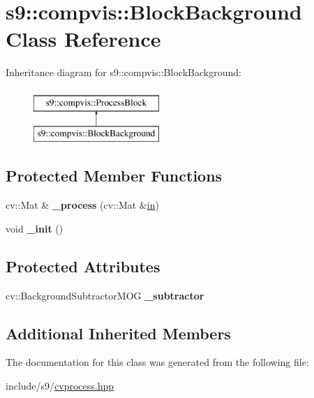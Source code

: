 \hypertarget{classs9_1_1compvis_1_1BlockBackground}{\section{s9\-:\-:compvis\-:\-:Block\-Background Class Reference}
\label{classs9_1_1compvis_1_1BlockBackground}
}
Inheritance diagram for s9\-:\-:compvis\-:\-:Block\-Background\-:\begin{figure}[H]
\begin{center}
\leavevmode
\includegraphics[height=2.000000cm]{classs9_1_1compvis_1_1BlockBackground}
\end{center}
\end{figure}
\subsection*{Protected Member Functions}
\begin{DoxyCompactItemize}
\item 
\hypertarget{classs9_1_1compvis_1_1BlockBackground_add7e518540385a836985c6946e59e5c6}{cv\-::\-Mat \& {\bfseries \-\_\-process} (cv\-::\-Mat \&\hyperlink{structin}{in})}\label{classs9_1_1compvis_1_1BlockBackground_add7e518540385a836985c6946e59e5c6}

\item 
\hypertarget{classs9_1_1compvis_1_1BlockBackground_ab6c5cfd547301eecabac428e42a5278c}{void {\bfseries \-\_\-init} ()}\label{classs9_1_1compvis_1_1BlockBackground_ab6c5cfd547301eecabac428e42a5278c}

\end{DoxyCompactItemize}
\subsection*{Protected Attributes}
\begin{DoxyCompactItemize}
\item 
\hypertarget{classs9_1_1compvis_1_1BlockBackground_a0e1dcdd35cb7453741b7144845ba14b9}{cv\-::\-Background\-Subtractor\-M\-O\-G {\bfseries \-\_\-subtractor}}\label{classs9_1_1compvis_1_1BlockBackground_a0e1dcdd35cb7453741b7144845ba14b9}

\end{DoxyCompactItemize}
\subsection*{Additional Inherited Members}


The documentation for this class was generated from the following file\-:\begin{DoxyCompactItemize}
\item 
include/s9/\hyperlink{cvprocess_8hpp}{cvprocess.\-hpp}\end{DoxyCompactItemize}
